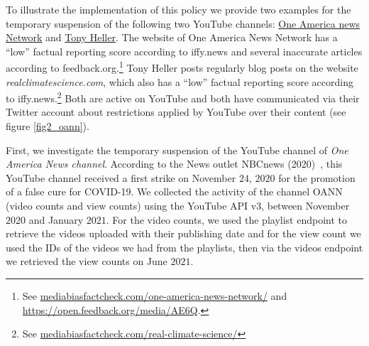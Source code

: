 \documentclass{article}
\begin{document}
To illustrate the implementation of this policy we provide two examples for the temporary suspension of the following two YouTube channels: \href{https://www.youtube.com/channel/UCNbIDJNNgaRrXOD7VllIMRQ}{One America news Network} and \href{https://www.youtube.com/user/TonyHeller1}{Tony Heller}. The website of One America News Network has a ``low'' factual reporting score according to iffy.news and several inaccurate articles according to feedback.org.\footnote{See \href{https://mediabiasfactcheck.com/one-america-news-network/}{mediabiasfactcheck.com/one-america-news-network/} and \href{https://open.feedback.org/media/AE6Q}{https://open.feedback.org/media/AE6Q}.}  Tony Heller posts regularly blog posts on the website {\it realclimatescience.com}, which also has a ``low'' factual reporting score according to iffy.news.\footnote{See \href{https://mediabiasfactcheck.com/real-climate-science/}{mediabiasfactcheck.com/real-climate-science/}} Both are active on YouTube and both have communicated via their Twitter account about restrictions applied by YouTube over their content (see figure \ref{fig2_oann}).

\smallskip

First, we investigate the temporary suspension of the YouTube channel of {\it One America News channel}. According to the News outlet NBCnews (2020)~\cite{nbcnews}, this YouTube channel received a first strike on November $24$, $2020$ for the promotion of a false cure for COVID-19.
We collected the activity of the channel OANN (video counts and view counts) using  the YouTube API v3, between November $2020$ and January $2021$. For the video counts, we used the playlist endpoint to retrieve the videos uploaded with their publishing date and for the view count we used the IDs of the videos we had from the playlists, then via the videos endpoint we retrieved the view counts on June $2021$.%
\end{document}
